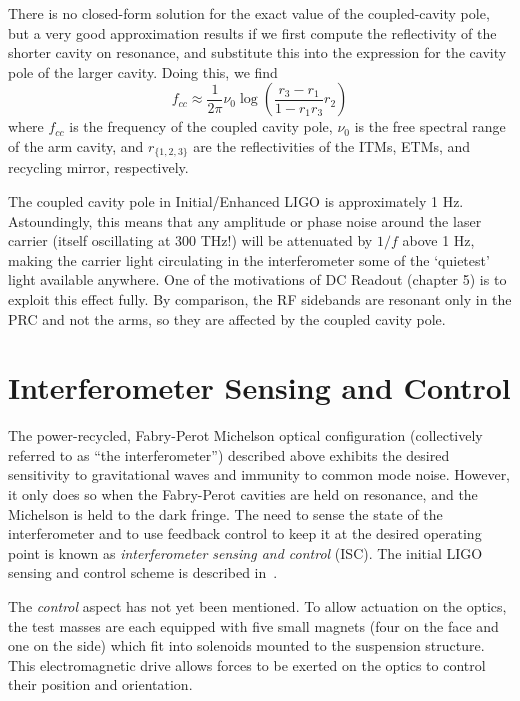 There is no closed-form solution for the exact value of the coupled-cavity
pole\cite{Rakhmanov2000Dynamics}, but a very good approximation 
results if we first compute the reflectivity of the shorter cavity on
resonance, and substitute this into the expression for the cavity pole
of the larger cavity. Doing this, we find
%
\begin{equation}
f_{cc} \approx \frac{1}{2\pi} \nu_0  \log \left(\frac{r_3 - r_1}{1 - r_1 r_3} r_2\right)
\end{equation}
where $f_{cc}$ is the frequency of the coupled cavity pole, $\nu_0$ is
the free spectral range of the arm cavity, and $r_{\{1,2,3\}}$ are the
reflectivities of the ITMs, ETMs, and recycling mirror, respectively.

The coupled cavity pole in Initial/Enhanced LIGO is approximately 1
Hz.  Astoundingly, this means that any amplitude or phase noise around
the laser carrier (itself oscillating at 300 THz!) will be attenuated
by $1/f$ above 1 Hz, making the carrier light circulating in the
interferometer some of the `quietest' light available anywhere.  One
of the motivations of DC Readout (chapter 5) is to exploit this effect
fully.  By comparison, the RF sidebands are resonant only in the PRC
and not the arms, so they are affected by the coupled cavity pole.

\section{Interferometer Sensing and Control}
\label{sec:isc}

The power-recycled, Fabry-Perot Michelson optical configuration
(collectively referred to as ``the interferometer'') described above
exhibits the desired sensitivity to gravitational waves and immunity
to common mode noise.  However, it only does so when the Fabry-Perot
cavities are held on resonance, and the Michelson is held to the dark
fringe.  The need to sense the state of the interferometer and to use
feedback control to keep it at the desired operating point is known as
\emph{interferometer sensing and control} (ISC).  The initial LIGO
sensing and control scheme is described
in~\cite{Fritschel2001Readout}.

The \emph{control} aspect has not yet been mentioned.  To allow
actuation on the optics, the test masses are each equipped with five
small magnets (four on the face and one on the side) which fit into
solenoids mounted to the suspension structure.  This electromagnetic
drive allows forces to be exerted on the optics to control their
position and orientation.
 
